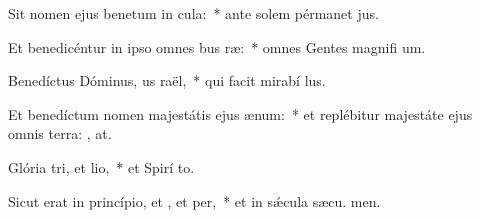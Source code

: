 \item Sit nomen ejus benetum in cula:~* ante solem pérmanet  jus.
\item Et benedicéntur in ipso omnes bus ræ:~* omnes Gentes magnifi um.
\item Benedíctus Dóminus, us raël,~* qui facit mirabí lus.
\item Et benedíctum nomen majestátis ejus  ænum:~* et replébitur majestáte ejus omnis terra: , at.
\item Glória tri, et lio,~* et Spirí to.
\item Sicut erat in princípio, et , et per,~* et in sǽcula sæcu. men.
